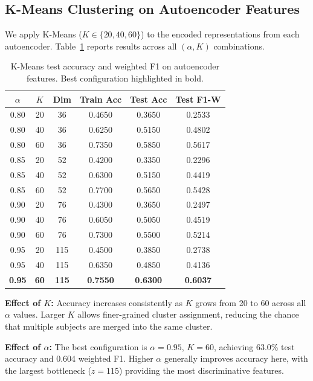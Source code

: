 \documentclass[11pt,a4paper]{article}
\begin{document}
\subsection{K-Means Clustering on Autoencoder Features}

We apply K-Means ($K \in \{20, 40, 60\}$) to the encoded representations from each
autoencoder. Table~\ref{tab:km-ae} reports results across all $(\alpha, K)$ combinations.

\begin{table}[H]
\centering
\caption{K-Means test accuracy and weighted F1 on autoencoder features.
         Best configuration highlighted in bold.}
\label{tab:km-ae}
\begin{tabular}{cccccc}
\toprule
$\alpha$ & $K$ & Dim & Train Acc & Test Acc & Test F1-W \\
\midrule
0.80 & 20 & 36 & 0.4650 & 0.3650 & 0.2533 \\
0.80 & 40 & 36 & 0.6250 & 0.5150 & 0.4802 \\
0.80 & 60 & 36 & 0.7350 & 0.5850 & 0.5617 \\
0.85 & 20 & 52 & 0.4200 & 0.3350 & 0.2296 \\
0.85 & 40 & 52 & 0.6300 & 0.5150 & 0.4419 \\
0.85 & 60 & 52 & 0.7700 & 0.5650 & 0.5428 \\
0.90 & 20 & 76 & 0.4300 & 0.3650 & 0.2497 \\
0.90 & 40 & 76 & 0.6050 & 0.5050 & 0.4519 \\
0.90 & 60 & 76 & 0.7300 & 0.5500 & 0.5214 \\
0.95 & 20 & 115 & 0.4500 & 0.3850 & 0.2738 \\
0.95 & 40 & 115 & 0.6350 & 0.4850 & 0.4136 \\
\textbf{0.95} & \textbf{60} & \textbf{115} & \textbf{0.7550} & \textbf{0.6300} & \textbf{0.6037} \\
\bottomrule
\end{tabular}
\end{table}

\noindent
\textbf{Effect of $K$:} Accuracy increases consistently as $K$ grows from 20 to 60 across
all $\alpha$ values. Larger $K$ allows finer-grained cluster assignment, reducing the
chance that multiple subjects are merged into the same cluster.

\noindent
\textbf{Effect of $\alpha$:} The best configuration is $\alpha=0.95$, $K=60$, achieving
63.0\% test accuracy and 0.604 weighted F1. Higher $\alpha$ generally improves accuracy
here, with the largest bottleneck ($z=115$) providing the most discriminative features.
\end{document}
